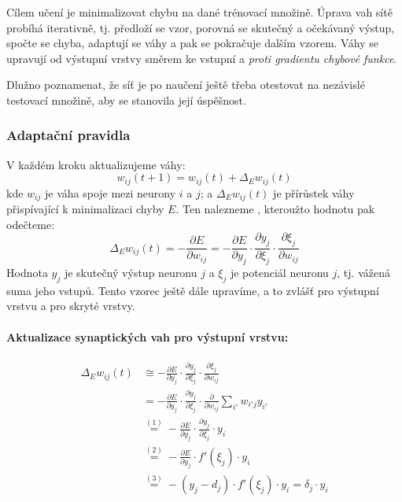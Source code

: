 \documentclass[11pt]{report} %
\numberwithin{equation}{section}
\begin{document}
Cílem učení je minimalizovat chybu na dané trénovací množině. Úprava vah sítě probíhá iterativně, tj. předloží se vzor, porovná se skutečný a očekávaný výstup, spočte se chyba, adaptují se váhy a pak se pokračuje dalším vzorem. Váhy se upravují od výstupní vrstvy směrem ke vstupní a \textit{proti gradientu chybové funkce}.

Dlužno poznamenat, že síť je po naučení ještě třeba otestovat na nezávislé testovací množině, aby se stanovila její úspěšnost.

\subsubsection{Adaptační pravidla}
V každém kroku aktualizujeme váhy:
$$
w_{ij}(t+1) = w_{ij}(t) + \Delta_E w_{ij}(t)
$$
kde $w_{ij}$ je váha spoje mezi neurony $i$ a $j$; a $\Delta_E w_{ij}(t)$ je přírůstek váhy přispívající k minimalizaci chyby $E$. Ten nalezneme , kteroužto hodnotu pak odečteme:
$$
\Delta_E w_{ij}(t) 
= -\frac{\partial E}{\partial w_{ij}} 
= -\frac{\partial E}{\partial y_j} \cdot \frac{\partial y_j}{\partial \xi_j} \cdot \frac{\partial \xi_j}{\partial w_{ij}}
$$
Hodnota $y_j$ je skutečný výstup neuronu $j$ a $\xi_j$ je potenciál neuronu $j$, tj. vážená suma jeho vstupů. Tento vzorec ještě dále upravíme, a to zvlášť pro výstupní vrstvu a pro skryté vrstvy. 

\paragraph{Aktualizace synaptických vah pro výstupní vrstvu:}
\begin{align*}
\Delta_E w_{ij}(t) 
&\cong -\frac{\partial E}{\partial y_j} \cdot \frac{\partial y_j}{\partial \xi_j} \cdot \frac{\partial \xi_j}{\partial w_{ij}}\\
&= -\frac{\partial E}{\partial y_j} \cdot \frac{\partial y_j}{\partial \xi_j} \cdot \frac{\partial}{\partial w_{ij}}\sum\limits_{i'} w_{i'j}y_{i'}\\
&\stackrel{(1)}{=} -\frac{\partial E}{\partial y_j} \cdot \frac{\partial y_j}{\partial \xi_j} \cdot y_{i}\\
&\stackrel{(2)}{=} -\frac{\partial E}{\partial y_j} \cdot f'(\xi_j) \cdot y_{i}\\
&\stackrel{(3)}{=} -(y_j - d_j) \cdot f'(\xi_j) \cdot y_{i} = \delta_j \cdot y_{i}\\
\end{align*}
\end{document}
